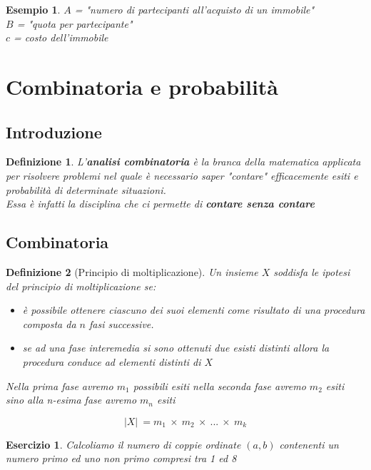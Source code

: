 \documentclass[12pt, a4paper]{article}
\theoremstyle{break}
\newtheorem{defn}{Definizione}
\theoremstyle{lemma}
\newtheorem{eser}{Esercizio}
\theoremstyle{lemma}
\theoremstyle{lemma}
\newtheorem{esem}{Esempio}
\begin{document}
\begin{esem}
  $A$ = "numero di partecipanti all'acquisto di un immobile"\\
  $B$ = "quota per partecipante"\\
  $c$ = costo dell'immobile
\end{esem}

\section{Combinatoria e probabilità}
\subsection{Introduzione}

\begin{defn}
  L'\textbf{analisi combinatoria} è la branca della matematica applicata per risolvere problemi nel quale è necessario saper "contare" efficacemente esiti e probabilità di determinate situazioni.\\
  Essa è infatti la disciplina che ci permette di \textbf{contare senza contare}
\end{defn}

\subsection{Combinatoria}
\begin{defn}[Principio di moltiplicazione]
  Un insieme $X$ soddisfa le ipotesi del principio di moltiplicazione se:

  \begin{itemize}
    \item è possibile ottenere ciascuno dei suoi elementi come risultato di una procedura composta da $n$ fasi successive.
    \item se ad una fase interemedia si sono ottenuti due esisti distinti allora la procedura conduce ad elementi distinti di $X$
  \end{itemize}

Nella prima fase avremo $m_1$ possibili esiti nella seconda fase avremo $m_2$ esiti sino alla n-esima fase avremo $m_n$ esiti

\begin{equation}
  |X|\ = m_1\ \times\ m_2\ \times\ ...\ \times\ m_k
\end{equation}
\end{defn}

\begin{eser}
  Calcoliamo il numero di coppie ordinate $(a,b)$ contenenti un numero primo ed uno non primo compresi tra 1 ed 8
\end{eser}
\end{document}
